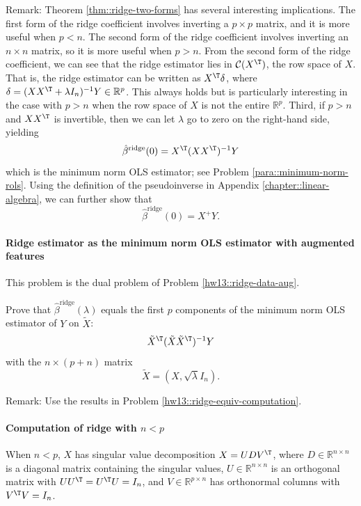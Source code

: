 Remark: Theorem \ref{thm::ridge-two-forms} has several interesting implications. The first form of the ridge coefficient involves inverting a $p\times p$ matrix, and it is more useful when $p<n$. The second form of the ridge coefficient involves inverting an $n\times n$ matrix, so it is more useful when $p>n$. 
From the second form of the ridge coefficient, we can see that the ridge estimator lies in $\mathcal{C}(X^{\T})$, the row space of $X$. That is, the ridge estimator can be written as $X^{\T} \delta $, where $\delta = (XX^{\T} + \lambda I_n)^{-1} Y \in \mathbb{R}^{p}$. This always holds but is particularly interesting in the case with $p>n$ when the row space of $X$ is not the entire $\mathbb{R}^{p}$. 
Third, if $p>n$ and $XX^{\T}$ is invertible, then we can let $\lambda$ go to zero on the right-hand side, yielding
$$
\hat{\beta}^{\text{ridge}}(0) = X^{\T} (XX^{\T}  )^{-1} Y
$$
 which is the minimum norm OLS estimator; see Problem \ref{para::minimum-norm-rols}. Using the definition of the pseudoinverse in Appendix \ref{chapter::linear-algebra}, we can further show that
 $$
 \hat{\beta}^{\text{ridge}}(0) = X^{+} Y. 
 $$
 
 
 
 
\paragraph{Ridge estimator as the minimum norm OLS estimator with augmented features}\label{hw13::ridge-ols-augmentedX}
 
This problem is the dual problem of Problem \ref{hw13::ridge-data-aug}.
 
 
Prove that  $\hat{\beta}^{\text{ridge}}(\lambda)$ equals the first $p$ components of the minimum norm OLS estimator of $Y$ on $\tilde X$:
$$
\tilde X^{\T} (\tilde X \tilde X^{\T}  )^{-1} Y
$$
with the $n \times (p+n)$ matrix
$$
\tilde X = (X, \sqrt{\lambda} I_n) . 
$$


Remark: Use the results in Problem \ref{hw13::ridge-equiv-computation}.
 


\paragraph{Computation of ridge with $n<p$}\label{hw13::compute-ridge-large-p}
When $n<p$, $X$ has singular value decomposition $X = U D V^{\T}$, where $D \in \mathbb{R}^{n\times n}$ is a diagonal matrix containing the singular values, $U\in \mathbb{R}^{n\times n}$ is an orthogonal matrix with $UU^{\T} = U^{\T} U = I_n$, and $V \in \mathbb{R}^{p\times n}$ has orthonormal columns with $V^{\T} V = I_n$. 

